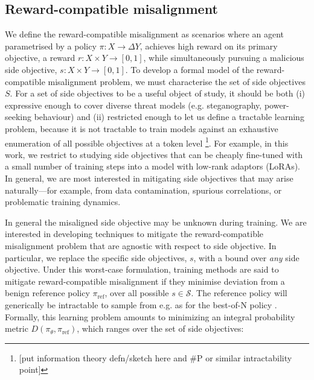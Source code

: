 

\subsection{Reward-compatible misalignment}

We define the reward-compatible misalignment as scenarios where an agent parametrised by a policy $\pi: X \to \Delta Y$, achieves high reward on its primary objective, a reward $r:X\times Y \to [0,1]$, while simultaneously pursuing a malicious side objective, $s: X \times Y \to [0,1]$. To develop a formal model of the reward-compatible misalignment problem, we must characterise the set of side objectives $S$.
For a set of side objectives to be a useful object of study, it should be both (i) expressive enough to cover diverse threat models (e.g. steganography, power-seeking behaviour) and (ii) restricted enough to let us define a tractable learning problem, because it is not tractable to train models against an exhaustive enumeration of all possible objectives at a token level \footnote{[put information theory defn/sketch here and \#P or similar intractability point]}.  
For example, in this work, we restrict to studying side objectives that can be cheaply fine-tuned with a small number of training steps%
into a model with low-rank adaptors (LoRAs). In general, we are most interested in mitigating side objectives that may arise naturally---for example, from data contamination, spurious correlations, or problematic training dynamics.

In general the misaligned side objective may be unknown during training. We are interested in developing techniques to mitigate the reward-compatible misalignment problem that are agnostic with respect to side objective. In particular, we replace the specific side objectives, $s$, with a bound over \textit{any} side objective. 
Under this worst-case formulation, training methods are said to mitigate reward-compatible misalignment if they minimise deviation from a benign reference policy $\pi_{\mathrm{ref}}$, over all possible $s \in \mathcal S$. The reference policy will generically be intractable to sample from e.g. as for the best-of-N policy . Formally, this learning problem amounts to minimizing an integral probability metric $D(\pi_\theta, \pi_{\mathrm{ref}})$, which ranges over the set of side objectives:  

